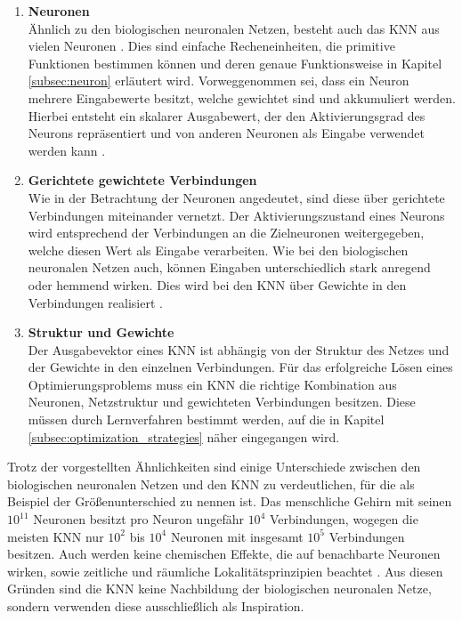 \begin{enumerate}
	\item \textbf{Neuronen}\\
	Ähnlich zu den biologischen neuronalen Netzen, besteht auch das \ac{KNN} aus vielen Neuronen \cite{zell2003simulation}. Dies sind einfache Recheneinheiten, die primitive Funktionen bestimmen können \cite{scherer2013neuronale} und deren genaue Funktionsweise in Kapitel \ref{subsec:neuron} erläutert wird. Vorweggenommen sei, dass ein Neuron mehrere Eingabewerte besitzt, welche gewichtet sind und akkumuliert werden. Hierbei entsteht ein skalarer Ausgabewert, der den Aktivierungsgrad des Neurons repräsentiert und von anderen Neuronen als Eingabe verwendet werden kann \cite{kriesel2008kleiner}. 
	 
	\item \textbf{Gerichtete gewichtete Verbindungen}\\
	Wie in der Betrachtung der Neuronen angedeutet, sind diese über gerichtete Verbindungen miteinander vernetzt. Der Aktivierungszustand eines Neurons wird entsprechend der Verbindungen an die Zielneuronen weitergegeben, welche diesen Wert als Eingabe verarbeiten. Wie bei den biologischen neuronalen Netzen auch, können Eingaben unterschiedlich stark anregend oder hemmend wirken. Dies wird bei den \ac{KNN} über Gewichte in den Verbindungen realisiert \cite{zell2003simulation}.
	
	\item \textbf{Struktur und Gewichte}\\
	Der Ausgabevektor eines \ac{KNN} ist abhängig von der Struktur des Netzes und der Gewichte in den einzelnen Verbindungen.
	Für das erfolgreiche Lösen eines Optimierungsproblems muss ein \ac{KNN} die richtige Kombination aus Neuronen, Netzstruktur und gewichteten Verbindungen besitzen. Diese müssen durch Lernverfahren bestimmt werden, auf die in Kapitel \ref{subsec:optimization_strategies} näher eingegangen wird.
\end{enumerate}
Trotz der vorgestellten Ähnlichkeiten sind einige Unterschiede zwischen den biologischen neuronalen Netzen und den \ac{KNN} zu verdeutlichen, für die als Beispiel der Größenunterschied zu nennen ist. Das menschliche Gehirn mit seinen ${10}^{11}$ Neuronen besitzt pro Neuron ungefähr $10^4$ Verbindungen, wogegen die meisten \ac{KNN} nur ${10}^{2}$ bis ${10}^{4}$ Neuronen mit insgesamt ${10}^{5}$ Verbindungen besitzen. Auch werden keine chemischen Effekte, die auf benachbarte Neuronen wirken, sowie zeitliche und räumliche Lokalitätsprinzipien beachtet \cite{zell2003simulation}. Aus diesen Gründen sind die \ac{KNN} keine Nachbildung der biologischen neuronalen Netze, sondern verwenden diese ausschließlich als Inspiration. 

